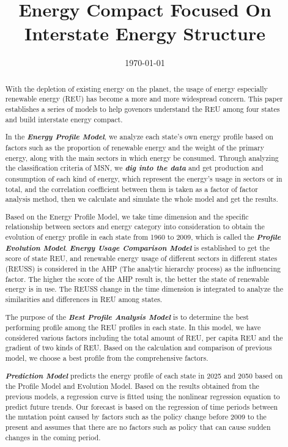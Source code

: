 \documentclass[a4paper,11pt]{article}
\title{Energy Compact Focused On Interstate Energy Structure}%
\date{\today}
\begin{document}
\begin{abstract}


\par With the depletion of existing energy on the planet, the usage of energy especially renewable energy (REU) has become a more and more widespread concern. This paper establishes a series of models to help govenors understand the REU among four states and build interstate energy compact.

\par In the \textbf{\emph{Energy Profile Model}}, we analyze each state's own energy profile based on factors such as the proportion of renewable energy and the weight of the primary energy, along with the main sectors in which energy be consumed. Through analyzing the classification criteria of MSN, we \textbf{\emph{dig into the data}} and get production and consumption of each kind of energy, which represent the energy's usage in sectors or in total, and the correlation coefficient between them is taken as a factor of factor analysis method, then we calculate and simulate the whole model and get the results.

\par Based on the Energy Profile Model, we take time dimension and the specific relationship between sectors and energy category into consideration to obtain the evolution of energy profile in each state from 1960 to 2009, which is called the \textbf{\emph{Profile Evolution Model}}. \textbf{\emph{Energy Usage Comparison Model}} is established to get the score of state REU, and renewable energy usage of different sectors in different states (REUSS) is considered in the AHP (The analytic hierarchy process) as the influencing factor. The higher the score of the AHP result is, the better the state of renewable energy is in use. The REUSS change in the time dimension is integrated to analyze the similarities and differences in REU among states.

\par The purpose of the \textbf{\emph{Best Profile Analysis Model}} is to determine the best performing profile among the REU profiles in each state. In this model, we have considered various factors including the total amount of REU, per capita REU and the gradient of two kinds of REU. Based on the calculation and comparison of previous model, we choose a best profile from the comprehensive factors.

\par \textbf{\emph{Prediction Model}} predicts the energy profile of each state in 2025 and 2050 based on the Profile Model and Evolution Model. Based on the results obtained from the previous models, a regression curve is fitted using the nonlinear regression equation to predict future trends. Our forecast is based on the regression of time periods between the mutation point caused by factors such as the policy change before 2009 to the present and assumes that there are no factors such as policy that can cause sudden changes in the coming period.


\end{abstract}
\end{document}
